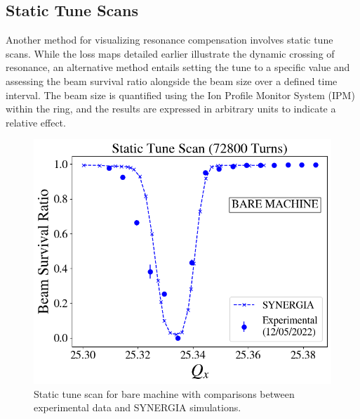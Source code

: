 \subsection{Static Tune Scans}

Another method for visualizing resonance compensation involves static tune scans. While the loss maps detailed earlier illustrate the dynamic crossing of resonance, an alternative method entails setting the tune to a specific value and assessing the beam survival ratio alongside the beam size over a defined time interval. The beam size is quantified using the Ion Profile Monitor System (IPM) within the ring, and the results are expressed in arbitrary units to indicate a relative effect.

\begin{figure}[H]
    \centering
    \includegraphics[width=\columnwidth]{chapter4/static2turns.png}
    \caption{Static tune scan for bare machine with comparisons between experimental data and SYNERGIA simulations.}
    \label{fig:static2}
\end{figure}



